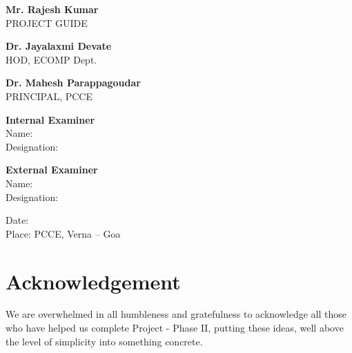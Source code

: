 \documentclass[12pt,a4paper]{report}
\begin{document}
\vspace{2.5cm}

\noindent
\begin{minipage}{0.5\textwidth}
\begin{flushleft}
\textbf{Mr. Rajesh Kumar}\\
PROJECT GUIDE
\end{flushleft}
\end{minipage}%
\begin{minipage}{0.5\textwidth}
\begin{flushright}
\textbf{Dr. Jayalaxmi Devate}\\
HOD, ECOMP Dept.
\end{flushright}
\end{minipage}

\vspace{2.5cm}

\begin{center}
\textbf{Dr. Mahesh Parappagoudar}\\
PRINCIPAL, PCCE
\end{center}

\vspace{2.5cm}

\noindent
\begin{minipage}{0.5\textwidth}
\begin{flushleft}
\textbf{Internal Examiner}\\
Name:\\
Designation:
\end{flushleft}
\end{minipage}%
\begin{minipage}{0.5\textwidth}
\begin{flushright}
\textbf{External Examiner}\\
Name:\\
Designation:
\end{flushright}
\end{minipage}

\vspace{1.5cm}
\noindent
Date: \\
Place: PCCE, Verna – Goa
\newpage

\chapter*{Acknowledgement}
We are overwhelmed in all humbleness and gratefulness to acknowledge all those who have helped us complete Project - Phase II, putting these ideas, well above the level of simplicity into something concrete.
\end{document}
